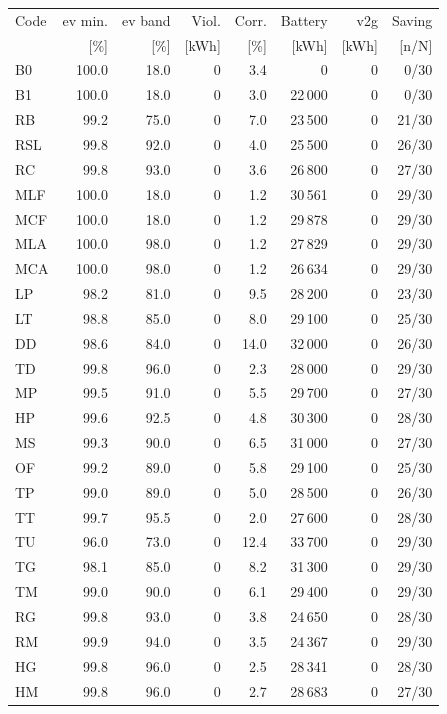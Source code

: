 \noindent\begin{minipage}{\textwidth}\singlespacing\captionsetup{font=footnotesize}
\setlength{\tabcolsep}{4pt}
\renewcommand{\arraystretch}{1.0}
\label{tab:full-scorecard-0-1}
\fontsize{8}{9}\selectfont
\begin{tabular*}{\textwidth}{@{\extracolsep{\fill}}lrrrrrrr@{}}
\toprule
Code & \gls{ev} min. & \gls{ev} band & Viol. & Corr. & Battery & \gls{v2g} & Saving\\
 & [\%] & [\%] & [kWh] & [\%] & [kWh] & [kWh] & [n/N]\\
\midrule
B0 & 100.0 & 18.0 & 0 & 3.4 & 0 & 0 & 0/30\\
B1 & 100.0 & 18.0 & 0 & 3.0 & 22\,000 & 0 & 0/30\\
RB & 99.2 & 75.0 & 0 & 7.0 & 23\,500 & 0 & 21/30\\
RSL & 99.8 & 92.0 & 0 & 4.0 & 25\,500 & 0 & 26/30\\
RC & 99.8 & 93.0 & 0 & 3.6 & 26\,800 & 0 & 27/30\\
MLF & 100.0 & 18.0 & 0 & 1.2 & 30\,561 & 0 & 29/30\\
MCF & 100.0 & 18.0 & 0 & 1.2 & 29\,878 & 0 & 29/30\\
MLA & 100.0 & 98.0 & 0 & 1.2 & 27\,829 & 0 & 29/30\\
MCA & 100.0 & 98.0 & 0 & 1.2 & 26\,634 & 0 & 29/30\\
LP & 98.2 & 81.0 & 0 & 9.5 & 28\,200 & 0 & 23/30\\
LT & 98.8 & 85.0 & 0 & 8.0 & 29\,100 & 0 & 25/30\\
DD & 98.6 & 84.0 & 0 & 14.0 & 32\,000 & 0 & 26/30\\
TD & 99.8 & 96.0 & 0 & 2.3 & 28\,000 & 0 & 29/30\\
MP & 99.5 & 91.0 & 0 & 5.5 & 29\,700 & 0 & 27/30\\
HP & 99.6 & 92.5 & 0 & 4.8 & 30\,300 & 0 & 28/30\\
MS & 99.3 & 90.0 & 0 & 6.5 & 31\,000 & 0 & 27/30\\
OF & 99.2 & 89.0 & 0 & 5.8 & 29\,100 & 0 & 25/30\\
TP & 99.0 & 89.0 & 0 & 5.0 & 28\,500 & 0 & 26/30\\
TT & 99.7 & 95.5 & 0 & 2.0 & 27\,600 & 0 & 28/30\\
TU & 96.0 & 73.0 & 0 & 12.4 & 33\,700 & 0 & 29/30\\
TG & 98.1 & 85.0 & 0 & 8.2 & 31\,300 & 0 & 29/30\\
TM & 99.0 & 90.0 & 0 & 6.1 & 29\,400 & 0 & 29/30\\
RG & 99.8 & 93.0 & 0 & 3.8 & 24\,650 & 0 & 28/30\\
RM & 99.9 & 94.0 & 0 & 3.5 & 24\,367 & 0 & 29/30\\
HG & 99.8 & 96.0 & 0 & 2.5 & 28\,341 & 0 & 28/30\\
HM & 99.8 & 96.0 & 0 & 2.7 & 28\,683 & 0 & 27/30\\
\bottomrule\end{tabular*}
\end{minipage}\par\medskip

